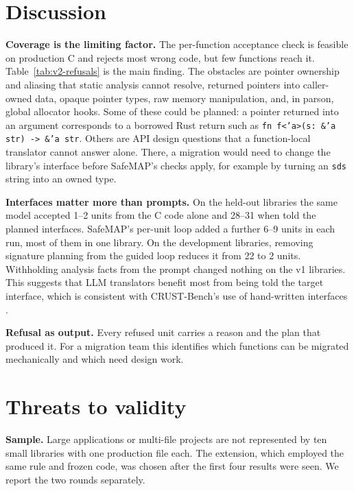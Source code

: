 \documentclass[pdflatex,sn-basic]{sn-jnl}
\newcommand{\tool}{SafeMAP\xspace}
\begin{document}


\section{Discussion}

\textbf{Coverage is the limiting factor.} The per-function acceptance check is
feasible on production C and rejects most wrong code, but few functions reach
it. Table~\ref{tab:v2-refusals} is the main finding. The obstacles are
pointer ownership and aliasing that static analysis cannot resolve, returned
pointers into caller-owned data, opaque pointer types, raw memory
manipulation, and, in parson, global allocator hooks. Some of these could be
planned: a pointer returned into an argument corresponds to a borrowed Rust
return such as \texttt{fn f<'a>(s: \&'a str) -> \&'a str}. Others are API
design questions that a function-local translator cannot answer alone. There,
a migration would need to change the library's interface before \tool's
checks apply, for example by turning an \texttt{sds} string into an owned
type.

\textbf{Interfaces matter more than prompts.} On the held-out libraries the
same model accepted 1--2 units from the C code alone and 28--31 when told the
planned interfaces. \tool's per-unit loop added a further 6--9 units in each
run, most of them in one library. On the
development libraries, removing signature planning from the guided loop
reduces it from 22 to 2 units. Withholding analysis
facts from the prompt changed nothing on the v1 libraries. This suggests that LLM translators benefit most from being
told the target interface, which is consistent with CRUST-Bench's use of
hand-written interfaces \citep{khatry2025crustbench}.

\textbf{Refusal as output.} Every refused unit carries a reason and the plan
that produced it. For a migration team this identifies which functions can be
migrated mechanically and which need design work.

\section{Threats to validity}
\label{sec:threats}

\textbf{Sample.} Large applications or multi-file projects are not represented 
by ten small libraries with one production file each. The extension, which 
employed the same rule and frozen code, was chosen after the first four results 
were seen. We report the two rounds separately.
\end{document}
